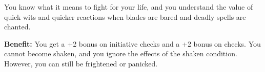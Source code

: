 
You know what it means to fight for your life, and you understand the value of quick wits and quicker reactions when blades are bared and deadly spells are chanted.

\textbf{Benefit:} You get a +2 bonus on initiative checks and a +2 bonus on  checks. You cannot become shaken, and you ignore the effects of the shaken condition. However, you can still be frightened or panicked.